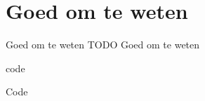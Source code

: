 \documentclass[../presentatie.tex]{subfiles}
\begin{document}
\section{Goed om te weten}

\clearrecentlist
    
\begin{frame}{Goed om te weten}
    TODO Goed om te weten
\end{frame}

\begin{saveblock}{code}
	\begin{highlightblock}[gobble=8,linewidth=0.5\textwidth,framexleftmargin=0.25em]
        Code         
	\end{highlightblock}
\end{saveblock}
\end{document}
